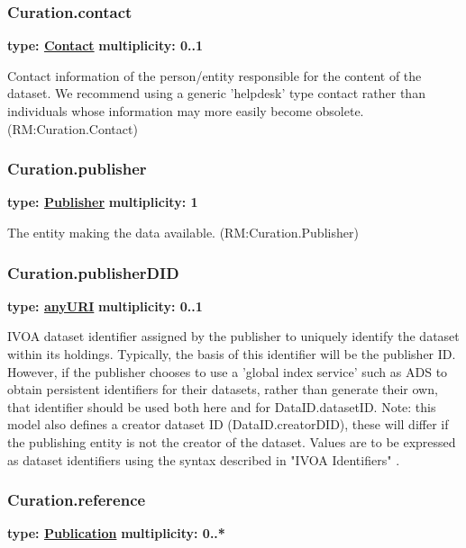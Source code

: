   \subsubsection{Curation.contact}
  \textbf{type: \hyperref[sect:contact]{Contact}} \newline
  \textbf{multiplicity: 0..1} \newline 

  Contact information of the person/entity responsible for the content of the
  dataset. We recommend using a generic 'helpdesk' type contact rather than
  individuals whose information may more easily become obsolete. (RM:Curation.Contact)
  
  \subsubsection{Curation.publisher}
  \textbf{type: \hyperref[sect:publisher]{Publisher}} \newline
  \textbf{multiplicity: 1} \newline
  
  The entity making the data available. (RM:Curation.Publisher)

  \subsubsection{Curation.publisherDID}
  \textbf{type: \hyperref[sect:ivoa]{anyURI}} \newline
  \textbf{multiplicity: 0..1} \newline
  
  IVOA dataset identifier assigned by the publisher to uniquely identify the
  dataset within its holdings. Typically, the basis of this identifier will
  be the publisher ID. However, if the publisher chooses to use a 'global index
  service' such as ADS to obtain persistent identifiers for their datasets,
  rather than generate their own, that identifier should be used both here and
  for DataID.datasetID. Note: this model also defines a creator dataset ID
  (DataID.creatorDID), these will differ if the publishing entity is not
  the creator of the dataset. Values are to be expressed as dataset identifiers
  using the syntax described in "IVOA Identifiers" \citep{2007ivoa.spec.0314P}.
  
  \subsubsection{Curation.reference}
  \textbf{type: \hyperref[sect:publication]{Publication}} \newline
  \textbf{multiplicity: 0..*} \newline
  
